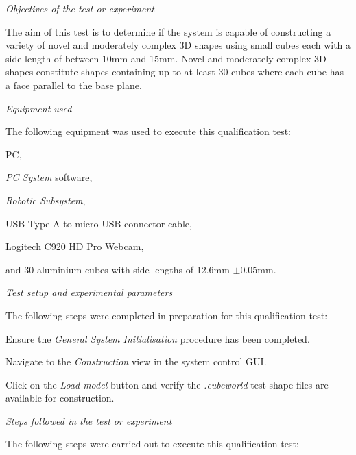 \textit{Objectives of the test or experiment}

The aim of this test is to determine if the system is capable of constructing a variety of novel and moderately complex 3D shapes using small cubes each with a side length of between 10mm and 15mm. Novel and moderately complex 3D shapes constitute shapes containing up to at least 30 cubes where each cube has a face parallel to the base plane.

\textit{Equipment used}

The following equipment was used to execute this qualification test:

\begin{compactitem}
	\item PC,
	\item \textit{PC System} software,
	\item \textit{Robotic Subsystem},
	\item USB Type A to micro USB connector cable,
	\item Logitech C920 HD Pro Webcam,
	\item and 30 aluminium cubes with side lengths of 12.6mm $\pm$0.05mm.
\end{compactitem}

\textit{Test setup and experimental parameters}

The following steps were completed in preparation for this qualification test:

\begin{compactenum}
	\item Ensure the \textit{General System Initialisation} procedure has been completed.
	\item Navigate to the \textit{Construction} view in the system control GUI.
	\item Click on the \textit{Load model} button and verify the \textit{.cubeworld} test shape files are available for construction.
\end{compactenum}

\textit{Steps followed in the test or experiment}

The following steps were carried out to execute this qualification test:

